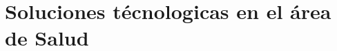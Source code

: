 \documentclass[aspectratio=169,compress]{beamer}
\begin{document}
%










\section{Soluciones técnologicas en el área de Salud}
% 






%
\end{document}
